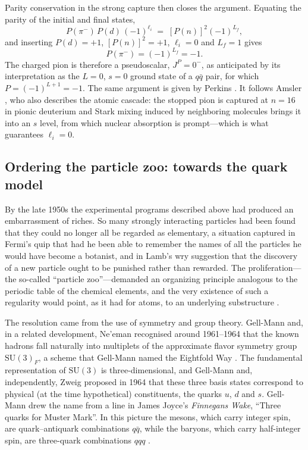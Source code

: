 Parity conservation in the strong capture then closes the argument. Equating the parity
of the initial and final states,
\begin{equation}
    P(\pi^-)\,P(d)\,(-1)^{\ell_i} \;=\; \left[P(n)\right]^2 (-1)^{L_f},
    \label{eq:pi_parity_balance}
\end{equation}
and inserting $P(d) = +1$, $\left[P(n)\right]^2 = +1$, $\ell_i = 0$ and $L_f = 1$ gives
\begin{equation}
    P(\pi^-) = (-1)^{L_f} = -1 .
    \label{eq:pi_parity_result}
\end{equation}
The charged pion is therefore a pseudoscalar, $J^P = 0^-$, as anticipated by its
interpretation as the $L = 0$, $s = 0$ ground state of a $q\bar q$ pair, for which
$P = (-1)^{L+1} = -1$. The same argument is given by Perkins
\cite[Ch.~3]{Perkins2000}. It follows Amsler \cite[Ch.~2]{Amsler2018}, who also
describes the atomic cascade: the stopped pion is captured at $n = 16$ in pionic
deuterium and Stark mixing induced by neighboring molecules brings it into an $s$ level,
from which nuclear absorption is prompt---which is what guarantees $\ell_i = 0$.

\FloatBarrier

\subsection{Ordering the particle zoo: towards the quark model}
\label{subsec:towards-quark-model}

By the late 1950s the experimental programs described above had produced an
embarrassment of riches. So many strongly interacting particles had been found that
they could no longer all be regarded as elementary, a situation captured in Fermi's
quip that had he been able to remember the names of all the particles he would have
become a botanist, and in Lamb's wry suggestion that the discovery of a new particle
ought to be punished rather than rewarded. The proliferation---the so-called
``particle zoo''---demanded an organizing principle analogous to the periodic table
of the chemical elements, and the very existence of such a regularity would point,
as it had for atoms, to an underlying substructure \cite[Ch.~1]{Amsler2018}.

The resolution came from the use of symmetry and group theory. Gell-Mann and, in a
related development, Ne'eman recognised around 1961--1964 that the known hadrons
fall naturally into multiplets of the approximate flavor symmetry group
$\mathrm{SU(3)}_{F}$, a scheme that Gell-Mann named the Eightfold Way
\cite[Ch.~2]{HalzenMartin1984}. The fundamental representation of $\mathrm{SU}(3)$
is three-dimensional, and Gell-Mann and, independently, Zweig proposed in 1964 that
these three basis states correspond to physical (at the time hypothetical)
constituents, the quarks $u$, $d$ and $s$. Gell-Mann drew the name from a line in
James Joyce's \textit{Finnegans Wake}, ``Three quarks for Muster Mark''. In this
picture the mesons, which carry integer spin, are quark--antiquark combinations
$q\bar{q}$, while the baryons, which carry half-integer spin, are three-quark
combinations $qqq$ \cite[Ch.~1]{Amsler2018}.

